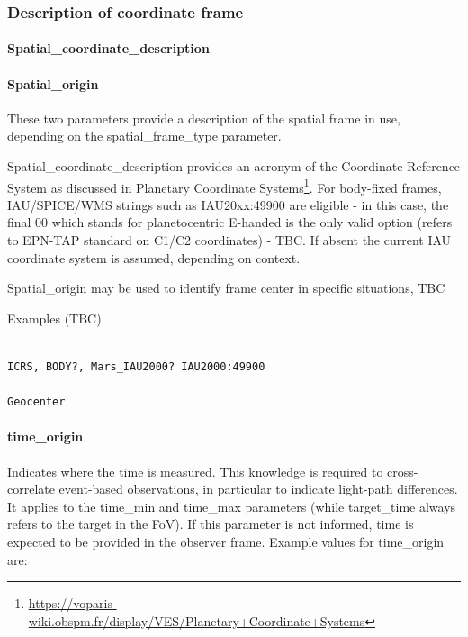 \documentclass[11pt,a4paper]{ivoa}
\begin{document}
\subsubsection{Description of coordinate frame}

\paragraph{Spatial\_coordinate\_description}

\paragraph{Spatial\_origin}

These two parameters provide a description of the spatial frame in use, depending on the spatial\_frame\_type parameter. 

Spatial\_coordinate\_description provides an acronym of the Coordinate Reference System as discussed in Planetary Coordinate Systems\footnote{\url{https://voparis-wiki.obspm.fr/display/VES/Planetary+Coordinate+Systems}}. For body-fixed frames, IAU/SPICE/WMS strings such as IAU20xx:49900 are eligible - in this case, the final 00 which stands for planetocentric E-handed is the only valid option (refers to EPN-TAP standard on C1/C2 coordinates) - TBC. If absent the current IAU coordinate system is assumed, depending on context. 

Spatial\_origin may be used to identify frame center in specific situations, TBC

Examples (TBC)

\begin{verbatim}

ICRS, BODY?, Mars_IAU2000? IAU2000:49900

Geocenter

\end{verbatim}

\paragraph{time\_origin}

Indicates where the time is measured. This knowledge is required to cross-correlate event-based observations, in particular to indicate light-path differences. It applies to the time\_min and time\_max parameters (while target\_time always refers to the target in the FoV). If this parameter is not informed, time is expected to be provided in the observer frame. Example values for time\_origin are:
\end{document}
